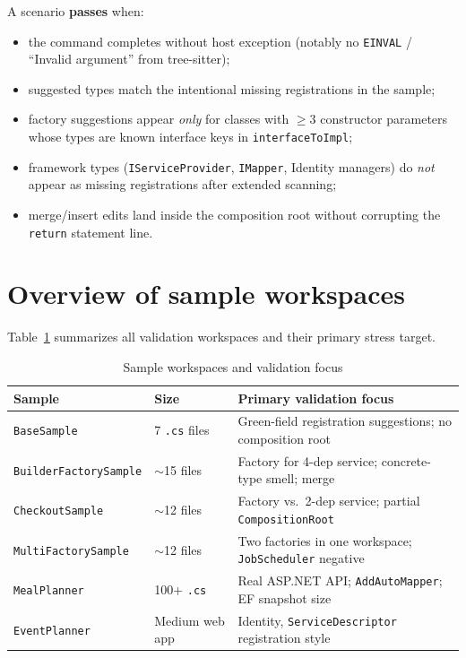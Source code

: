 A scenario \textbf{passes} when:
\begin{itemize}
	\item the command completes without host exception (notably no \texttt{EINVAL} / ``Invalid argument'' from tree-sitter);
	\item suggested types match the intentional missing registrations in the sample;
	\item factory suggestions appear \emph{only} for classes with \(\geq 3\) constructor parameters whose types are known interface keys in \texttt{interfaceToImpl};
	\item framework types (\texttt{IServiceProvider}, \texttt{IMapper}, Identity managers) do \emph{not} appear as missing registrations after extended scanning;
	\item merge/insert edits land inside the composition root without corrupting the \texttt{return} statement line.
\end{itemize}

\section{Overview of sample workspaces}
\label{chap5:overview}

Table~\ref{tab:samples-overview} summarizes all validation workspaces and their primary stress target.

\begin{table}[htbp]
\centering
\caption{Sample workspaces and validation focus}
\label{tab:samples-overview}
\small
\begin{tabular}{|l|l|p{7.2cm}|}
\hline
\textbf{Sample} & \textbf{Size} & \textbf{Primary validation focus} \\
\hline
\texttt{BaseSample} & 7 \texttt{.cs} files & Green-field registration suggestions; no composition root \\
\hline
\texttt{BuilderFactorySample} & $\sim$15 files & Factory for 4-dep service; concrete-type smell; merge \\
\hline
\texttt{CheckoutSample} & $\sim$12 files & Factory vs.\ 2-dep service; partial \texttt{CompositionRoot} \\
\hline
\texttt{MultiFactorySample} & $\sim$12 files & Two factories in one workspace; \texttt{JobScheduler} negative \\
\hline
\texttt{MealPlanner} & 100+ \texttt{.cs} & Real ASP.NET API; \texttt{AddAutoMapper}; EF snapshot size \\
\hline
\texttt{EventPlanner} & Medium web app & Identity, \texttt{ServiceDescriptor} registration style \\
\hline
\end{tabular}
\end{table}

